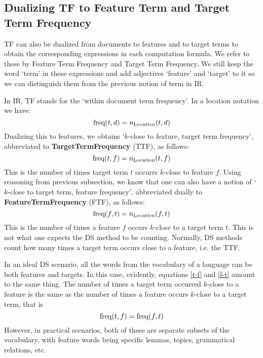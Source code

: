 \subsection{Dualizing TF to Feature Term and Target Term Frequency}
\label{subsec-TF}

TF can also be dualized from documents to features and to target terms to obtain the corresponding expressions in each computation formula.  We refer to these by Feature Term Frequency and Target Term  Frequency. We still keep the  word `term'  in these expressions and add adjectives `feature' and `target'  to it so we can distinguish them from the previous notion of term in IR. 

In IR, TF stands for the `within document term frequency'. In a location notation we have:
\[
\textmd{freq}(t,d) = n_{\textmd{Location}}(t,d)
\]
Dualizing this to features, we obtains `$k$-close to feature, target  term frequency', abbreviated to {\bf TargetTermFrequency} (TTF), as follows:
\begin{equation}
\label{t-f}
\textmd{freq}(t,f) = n_{\textmd{Location}}(t,f)
\end{equation}
This is the number of times target  term $t$ occurrs $k$-close to feature $f$.  Using reasoning from previous subsection, we know that one can also have a notion of `$k$-close to target term, feature frequency', abbreviated dually to {\bf FeatureTermFrequency} (FTF), as follows:
\begin{equation}
\label{f-t}
\textmd{freq}(f,t) = n_{\textmd{Location}}(f,t)
\end{equation}
This is the number of times a feature $f$ occurs $k$-close to a target term $t$.  This is not what one expects the DS method to be counting. Normally, DS methods count how many times a target term occurs close to a feature, i.e. the TTF. 

In an ideal DS scenario, all the words from the vocabulary of a language can be both features and targets. In this case, evidently, equations \ref{t-f} and \ref{f-t} amount to the same thing. The number of times a target term occurred $k$-close to a feature is the same as the number of times a feature occurs $k$-close to a target term, that is
\begin{equation}
\label{ttf=ftf}
\textmd{freq}(t,f) = \textmd{freq}(f,t) 
\end{equation}
However, in practical scenarios, both of these are separate subsets of the vocabulary, with feature words being specific lemmas, topics, grammatical relations, etc. 

